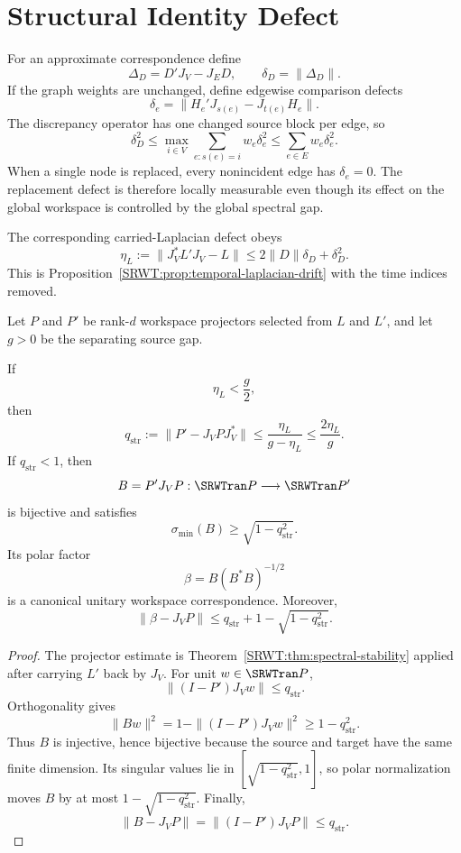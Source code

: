\section{Structural Identity Defect}

For an approximate correspondence define
\[
\boxed{
\Delta_D=D'J_V-J_ED,
\qquad
\delta_D=\|\Delta_D\|.
}
\]
If the graph weights are unchanged, define edgewise comparison defects
\[
\delta_e
=
\|H_e'J_{s(e)}-J_{t(e)}H_e\|.
\]
The discrepancy operator has one changed source block per edge, so
\[
\boxed{
\delta_D^2
\leq
\max_{i\in V}
\sum_{e:s(e)=i}w_e\delta_e^2
\leq
\sum_{e\in E}w_e\delta_e^2.
}
\]
When a single node is replaced, every nonincident edge has \(\delta_e=0\).
The replacement defect is therefore locally measurable even though its effect
on the global workspace is controlled by the global spectral gap.

The corresponding carried-Laplacian defect obeys
\[
\boxed{
\eta_L
:=
\|J_V^*L'J_V-L\|
\leq
2\|D\|\delta_D+\delta_D^2.
}
\]
This is Proposition~\ref{SRWT:prop:temporal-laplacian-drift} with the time indices
removed.

Let \(P\) and \(P'\) be rank-\(d\) workspace projectors selected from \(L\)
and \(L'\), and let \(g>0\) be the separating source gap.

\begin{SRWTtheorem}\label{SRWT:thm:approx-structural-replacement}
If
\[
\eta_L<\frac g2,
\]
then
\[
\boxed{
q_{\mathrm{str}}
:=
\|P'-J_VPJ_V^*\|
\leq
\frac{\eta_L}{g-\eta_L}
\leq
\frac{2\eta_L}{g}.
}
\]
If \(q_{\mathrm{str}}<1\), then
\[
B=P'J_VP:\SRWTran P\longrightarrow\SRWTran P'
\]
is bijective and satisfies
\[
\sigma_{\min}(B)
\geq
\sqrt{1-q_{\mathrm{str}}^2}.
\]
Its polar factor
\[
\boxed{
\beta
=B(B^*B)^{-1/2}
}
\]
is a canonical unitary workspace correspondence. Moreover,
\[
\boxed{
\|\beta-J_VP\|
\leq
q_{\mathrm{str}}
+
1-\sqrt{1-q_{\mathrm{str}}^2}.
}
\]
\end{SRWTtheorem}

\begin{proof}
The projector estimate is Theorem~\ref{SRWT:thm:spectral-stability} applied after
carrying \(L'\) back by \(J_V\). For unit \(w\in\SRWTran P\),
\[
\|(I-P')J_Vw\|
\leq q_{\mathrm{str}}.
\]
Orthogonality gives
\[
\|Bw\|^2
=1-\|(I-P')J_Vw\|^2
\geq1-q_{\mathrm{str}}^2.
\]
Thus \(B\) is injective, hence bijective because the source and target have
the same finite dimension. Its singular values lie in
\([\sqrt{1-q_{\mathrm{str}}^2},1]\), so polar normalization moves \(B\) by at
most \(1-\sqrt{1-q_{\mathrm{str}}^2}\). Finally,
\[
\|B-J_VP\|=\|(I-P')J_VP\|\leq q_{\mathrm{str}}.
\]
\end{proof}

